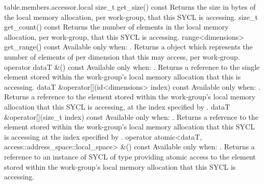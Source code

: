 {table.members.accessor.local}
  \addRow
    { size_t get_size() const }
    {
      Returns the size in bytes of the local memory allocation, per work-group,
      that this SYCL  is accessing.
    }
  \addRow
    { size_t get_count() const }
    {
      Returns the number of  elements in the local memory allocation, per work-group,
      that this SYCL  is accessing.
    }
  \addRow
    { range<dimensions> get_range() const }
    {
      Available only when: .
      \newline
      Returns a  object which represents the number of
      elements of  per dimension that this
       may access, per work-group.
    }
  \addRow
    { operator dataT \&() const }
    {
      Available only when: .
      \newline
      Returns a reference to the single element stored within the work-group's local memory
      allocation that this  is accessing.
    }
  \addRow
    { dataT \&operator[](id<dimensions> index) const }
    {
      Available only when: .
      \newline
      Returns a reference to the element stored within the work-group's local memory
      allocation that this SYCL  is accessing, at the index
      specified by .
    }
  \addRow
    { dataT \&operator[](size_t index) const }
    {
      Available only when: .
      \newline
      Returns a reference to the element stored within the work-group's local memory
      allocation that this SYCL  is accessing at the index
      specified by .
    }
  \addRowTwoL
    { operator atomic<dataT, }
    { access::address_space::local_space> \&() const }
    {
      Available only when: .
      \newline
      Returns a reference to an instance of SYCL  of type
       providing atomic access to the element stored within
      the work-group's local memory allocation that this SYCL 
      is accessing.
    }
